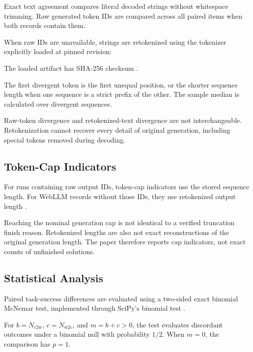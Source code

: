 \documentclass[conference]{IEEEtran}
\begin{document}
Exact text agreement compares literal decoded strings
without whitespace trimming. Raw generated token IDs are
compared across all paired items when both records contain
them.

When raw IDs are unavailable, strings are retokenized using
the  tokenizer explicitly
loaded at pinned revision:

\begin{quote}
\footnotesize
{}
\end{quote}

The loaded  artifact has SHA-256
checksum
\cite{repository}.

The first divergent token is the first unequal position,
or the shorter sequence length when one sequence is a
strict prefix of the other. The sample median is calculated
over divergent sequences.

Raw-token divergence and retokenized-text divergence are
not interchangeable. Retokenization cannot recover every
detail of original generation, including special tokens
removed during decoding.


\subsection{Token-Cap Indicators}

For runs containing raw output IDs, token-cap indicators
use the stored sequence length. For WebLLM records without
those IDs, they use retokenized output length
\cite{repository}.

Reaching the nominal generation cap is not identical to a
verified truncation finish reason. Retokenized lengths are
also not exact reconstructions of the original generation
length. The paper therefore reports cap indicators,
not exact counts of unfinished solutions.


\subsection{Statistical Analysis}

Paired task-success differences are evaluated using a
two-sided exact binomial McNemar test, implemented through
SciPy's binomial test \cite{scipy,scipybinom}.

For $b=N_{\mathrm{c2w}}$, $c=N_{\mathrm{w2c}}$, and
$m=b+c>0$, the test evaluates discordant outcomes under a
binomial null with probability $1/2$. When $m=0$, the
comparison has $p=1$.
\end{document}
